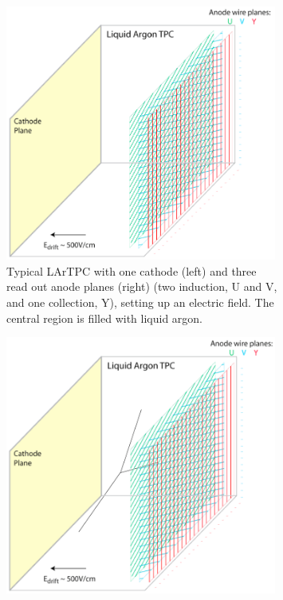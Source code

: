 \begin{figure}[p]
  \centering
  \begin{subfigure}[t]{0.48\linewidth}
    \centering
    \includegraphics[width=0.98\textwidth]{LArTPCOperation1.png}
    \caption{Typical LArTPC with one cathode (left) and three read out anode planes (right) (two induction, U and V, and one collection, Y), setting up an electric field.  The central region is filled with liquid argon.}
    \label{fig:LArTPCOperation1}
  \end{subfigure}
  \hfill
  \begin{subfigure}[t]{0.48\linewidth}
    \centering
    \includegraphics[width=0.98\textwidth]{LArTPCOperation2.png}

\end{subfigure}
\end{figure}
